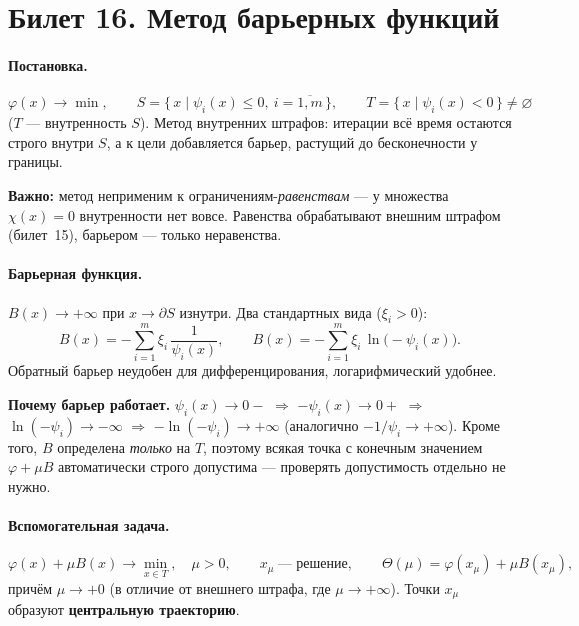 \section{Билет 16. Метод барьерных функций}


\paragraph{Постановка.}
\[
  \varphi(x) \to \min , \qquad
  S = \{\, x \mid \psi_i(x) \le 0,\ i = \overline{1,m} \,\} ,
  \qquad
  T = \{\, x \mid \psi_i(x) < 0 \,\} \ne \varnothing
\]
($T$ — внутренность $S$). Метод внутренних штрафов: итерации всё время
остаются строго внутри $S$, а к цели добавляется барьер, растущий до
бесконечности у границы.

\textbf{Важно:} метод неприменим к ограничениям-\emph{равенствам} — у
множества $\chi(x) = 0$ внутренности нет вовсе. Равенства обрабатывают внешним
штрафом (билет~15), барьером — только неравенства.

\paragraph{Барьерная функция.}
$B(x) \to +\infty$ при $x \to \partial S$ изнутри. Два стандартных вида
($\xi_i > 0$):
\[
  B(x) = -\sum_{i=1}^{m}\xi_i\,\frac{1}{\psi_i(x)} ,
  \qquad
  B(x) = -\sum_{i=1}^{m}\xi_i\,\ln\big(-\psi_i(x)\big) .
\]
Обратный барьер неудобен для дифференцирования, логарифмический удобнее.

\textbf{Почему барьер работает.} $\psi_i(x) \to 0-$ $\Rightarrow$
$-\psi_i(x) \to 0+$ $\Rightarrow$ $\ln(-\psi_i) \to -\infty$ $\Rightarrow$
$-\ln(-\psi_i) \to +\infty$ (аналогично $-1/\psi_i \to +\infty$). Кроме того,
$B$ определена \emph{только} на $T$, поэтому всякая точка с конечным
значением $\varphi + \mu B$ автоматически строго допустима — проверять
допустимость отдельно не нужно.

\paragraph{Вспомогательная задача.}
\[
  \varphi(x) + \mu B(x) \to \min_{x \in T} , \quad \mu > 0 ,
  \qquad x_\mu \ \text{— решение} ,
  \qquad \Theta(\mu) = \varphi(x_\mu) + \mu B(x_\mu) ,
\]
причём $\mu \to +0$ (в отличие от внешнего штрафа, где $\mu \to +\infty$).
Точки $x_\mu$ образуют \textbf{центральную траекторию}.

